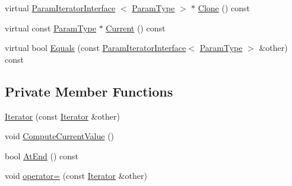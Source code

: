 \begin{DoxyCompactItemize}
\item 
virtual \hyperlink{classtesting_1_1internal_1_1ParamIteratorInterface}{\-Param\-Iterator\-Interface}\*
$<$ \hyperlink{classtesting_1_1internal_1_1CartesianProductGenerator5_a39880336d68d34bdc77e7e8726d38a91}{\-Param\-Type} $>$ $\ast$ \hyperlink{classtesting_1_1internal_1_1CartesianProductGenerator5_1_1Iterator_a4bee4982ee1152c6935ffd0c2d749421}{\-Clone} () const 
\item 
virtual const \hyperlink{classtesting_1_1internal_1_1CartesianProductGenerator5_a39880336d68d34bdc77e7e8726d38a91}{\-Param\-Type} $\ast$ \hyperlink{classtesting_1_1internal_1_1CartesianProductGenerator5_1_1Iterator_ab27aeab5db14a30f077a37989ce9261c}{\-Current} () const 
\item 
virtual bool \hyperlink{classtesting_1_1internal_1_1CartesianProductGenerator5_1_1Iterator_a8f18f9a017a12730cce28c07460bbc14}{\-Equals} (const \hyperlink{classtesting_1_1internal_1_1ParamIteratorInterface}{\-Param\-Iterator\-Interface}$<$ \hyperlink{classtesting_1_1internal_1_1CartesianProductGenerator5_a39880336d68d34bdc77e7e8726d38a91}{\-Param\-Type} $>$ \&other) const 
\end{DoxyCompactItemize}
\subsection*{\-Private \-Member \-Functions}
\begin{DoxyCompactItemize}
\item 
\hyperlink{classtesting_1_1internal_1_1CartesianProductGenerator5_1_1Iterator_a2b76c2e597bc9393f2b99e869e4fa8d2}{\-Iterator} (const \hyperlink{classtesting_1_1internal_1_1CartesianProductGenerator5_1_1Iterator}{\-Iterator} \&other)
\item 
void \hyperlink{classtesting_1_1internal_1_1CartesianProductGenerator5_1_1Iterator_a4c18cbbef042bab72ed484f5b6923908}{\-Compute\-Current\-Value} ()
\item 
bool \hyperlink{classtesting_1_1internal_1_1CartesianProductGenerator5_1_1Iterator_a6eb9b47ffa4b10f0dca403fc597faba0}{\-At\-End} () const 
\item 
void \hyperlink{classtesting_1_1internal_1_1CartesianProductGenerator5_1_1Iterator_ac087d740f6aa05ec07afd0c5c0327105}{operator=} (const \hyperlink{classtesting_1_1internal_1_1CartesianProductGenerator5_1_1Iterator}{\-Iterator} \&other)
\end{DoxyCompactItemize}
